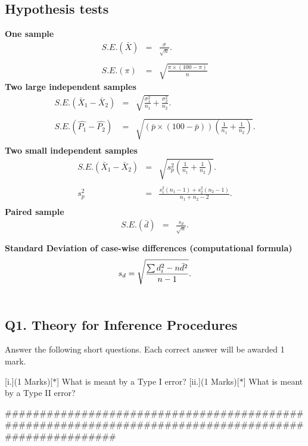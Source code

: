 \subsection*{Hypothesis tests}
{\bf One sample}
\begin{eqnarray*}
S.E.(\bar{X})&=&\frac{\sigma}{\sqrt{n}}.\\\\
S.E.(\pi)&=&\sqrt{\frac{\pi\times(100-\pi)}{n}}
\end{eqnarray*}
{\bf Two large independent samples}
\begin{eqnarray*}
S.E.(\bar{X}_1-\bar{X}_2)&=&\sqrt{\frac{\sigma^2_1}{n_1}+\frac{\sigma_2^2}{n_2}}.\\\\
S.E.(\hat{P_1}-\hat{P_2})&=&\sqrt{\left(\bar{p}\times(100-\bar{p})\right)\left(\frac{1}{n_1}+\frac{1}{n_2}\right)}.\\
\end{eqnarray*}
{\bf Two small independent samples}
\begin{eqnarray*}
S.E.(\bar{X}_1-\bar{X}_2)&=&\sqrt{s_p^2\left(\frac{1}{n_1}+\frac{1}{n_2}\right)}.\\\\
s_p^2&=&\frac{s_1^2(n_1-1)+s_2^2(n_2-1)}{n_1+n_2-2}.\\
\end{eqnarray*}
{\bf Paired sample}
\begin{eqnarray*}
S.E.(\bar{d})&=&\frac{s_d}{\sqrt{n}}.\\\\
\end{eqnarray*}
{\bf Standard Deviation of case-wise differences (computational formula)}
\begin{eqnarray*}
s_d = \sqrt{ {\sum d_i^2 - n\bar{d}^2 \over n-1}}.\\\\
\end{eqnarray*}
\subsection*{Q1. Theory for Inference Procedures }
Answer the following short questions. Each correct answer will be awarded 1 mark.
\begin{itemize}
[i.](1 Marks)[$\ast$] What is meant by a Type I error?
[ii.](1 Marks)[$\ast$] What is meant by a Type II error?
\end{itemize}
######################################################################################################


